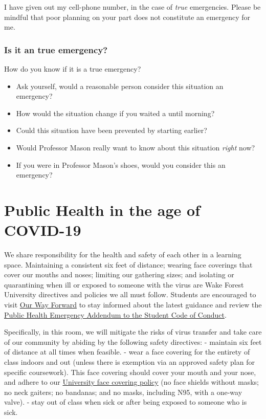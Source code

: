 \documentclass[11pt,]{article}
\providecommand{\tightlist}{%
  \setlength{\itemsep}{0pt}\setlength{\parskip}{0pt}}
\begin{document}
I have given out my cell-phone number, in the case of \emph{true}
emergencies. Please be mindful that poor planning on your part does not
constitute an emergency for me.

\hypertarget{is-it-an-true-emergency}{%
\subsubsection{Is it an true emergency?}\label{is-it-an-true-emergency}}

How do you know if it is a true emergency?

\begin{itemize}
\tightlist
\item
  Ask yourself, would a reasonable person consider this situation an
  emergency?
\item
  How would the situation change if you waited a until morning?
\item
  Could this situation have been prevented by starting earlier?
\item
  Would Professor Mason really want to know about this situation
  \emph{right} now?
\item
  If you were in Professor Mason's shoes, would you consider this an
  emergency?
\end{itemize}

\hypertarget{public-health-in-the-age-of-covid-19}{%
\section{Public Health in the age of
COVID-19}\label{public-health-in-the-age-of-covid-19}}

We share responsibility for the health and safety of each other in a
learning space. Maintaining a consistent six feet of distance; wearing
face coverings that cover our mouths and noses; limiting our gathering
sizes; and isolating or quarantining when ill or exposed to someone with
the virus are Wake Forest University directives and policies we all must
follow. Students are encouraged to visit
\href{https://ourwayforward.wfu.edu/}{Our Way Forward} to stay informed
about the latest guidance and review the
\href{https://studentconduct.wfu.edu/undergraduate-student-handbook/public-health-emergency-addendum/}{Public
Health Emergency Addendum to the Student Code of Conduct}.

Specifically, in this room, we will mitigate the risks of virus transfer
and take care of our community by abiding by the following safety
directives: - maintain six feet of distance at all times when feasible.
- wear a face covering for the entirety of class indoors and out (unless
there is exemption via an approved safety plan for specific coursework).
This face covering should cover your mouth and your nose, and adhere to
our
\href{https://drive.google.com/file/d/1Tqo-by1sjmc-kWUTwAqeNdaHq8OBsU9B/view}{University
face covering policy} (no face shields without masks; no neck gaiters;
no bandanas; and no masks, including N95, with a one-way valve). - stay
out of class when sick or after being exposed to someone who is sick.
\end{document}

